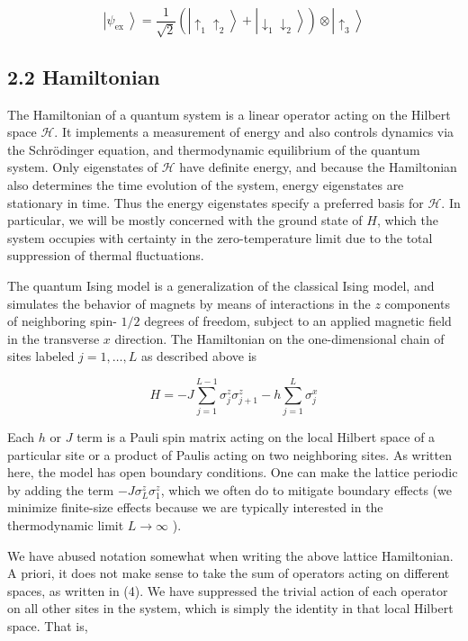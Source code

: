 \documentclass[12pt]{article}
\begin{document}
\begin{equation*}
\left|\psi_{\text {ex }}\right\rangle=\frac{1}{\sqrt{2}}\left(\left|\uparrow_{1} \uparrow_{2}\right\rangle+\left|\downarrow_{1} \downarrow_{2}\right\rangle\right) \otimes\left|\uparrow_{3}\right\rangle \tag{3}
\end{equation*}


\subsection*{2.2 Hamiltonian}
The Hamiltonian of a quantum system is a linear operator acting on the Hilbert space $\mathcal{H}$. It implements a measurement of energy and also controls dynamics via the Schrödinger equation, and thermodynamic equilibrium of the quantum system. Only eigenstates of $\mathcal{H}$ have definite energy, and because the Hamiltonian also determines the time evolution of the system, energy eigenstates are stationary in time. Thus the energy eigenstates specify a preferred basis for $\mathcal{H}$. In particular, we will be mostly concerned with the ground state of $H$, which the system occupies with certainty in the zero-temperature limit due to the total suppression of thermal fluctuations.

The quantum Ising model is a generalization of the classical Ising model, and simulates the behavior of magnets by means of interactions in the $z$ components of neighboring spin- $1 / 2$ degrees of freedom, subject to an applied magnetic field in the transverse $x$ direction. The Hamiltonian on the one-dimensional chain of sites labeled $j=1, \ldots, L$ as described above is


\begin{equation*}
H=-J \sum_{j=1}^{L-1} \sigma_{j}^{z} \sigma_{j+1}^{z}-h \sum_{j=1}^{L} \sigma_{j}^{x} \tag{4}
\end{equation*}


Each $h$ or $J$ term is a Pauli spin matrix acting on the local Hilbert space of a particular site or a product of Paulis acting on two neighboring sites. As written here, the model has open boundary conditions. One can make the lattice periodic by adding the term $-J \sigma_{L}^{z} \sigma_{1}^{z}$, which we often do to mitigate boundary effects (we minimize finite-size effects because we are typically interested in the thermodynamic limit $L \rightarrow \infty$ ).

We have abused notation somewhat when writing the above lattice Hamiltonian. A priori, it does not make sense to take the sum of operators acting on different spaces, as written in (4). We have suppressed the trivial action of each operator on all other sites in the system, which is simply the identity in that local Hilbert space. That is,
\end{document}

